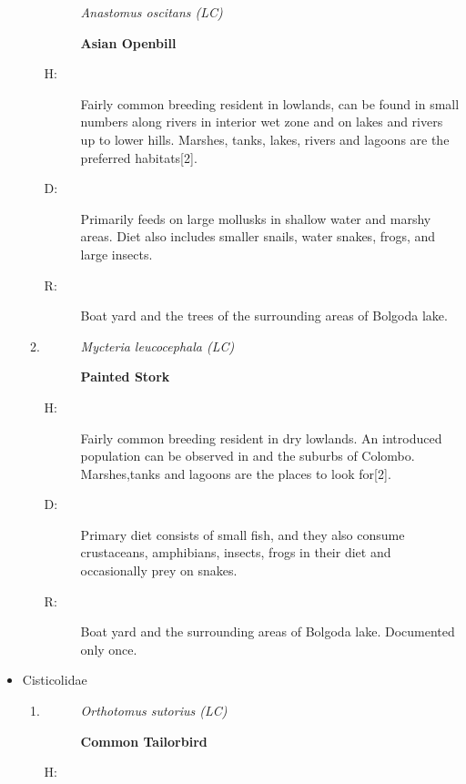\begin{itemize}
\begin{enumerate}
\begin{description}%
\item[]%
\textit{Anastomus oscitans (LC)}%
\item[]%
\textbf{Asian Openbill}%
\end{description}%
\begin{description}%
\item[H: ]%
Fairly common breeding resident in lowlands, can be found in small numbers along rivers in interior wet zone and on lakes and rivers up to lower hills. Marshes, tanks, lakes, rivers and lagoons are the preferred habitats{[}2{]}.%
\item[D: ]%
Primarily feeds on large mollusks in shallow water and marshy areas. Diet also includes smaller snails, water snakes, frogs, and large insects.%
\item[R: ]%
Boat yard and the trees of the surrounding areas of Bolgoda lake.%
\end{description}%
\item%
\begin{description}%
\item[]%
\textit{Mycteria leucocephala (LC)}%
\item[]%
\textbf{Painted Stork}%
\end{description}%
\begin{description}%
\item[H: ]%
Fairly common breeding resident in dry lowlands. An introduced population can be observed in and the suburbs of Colombo. Marshes,tanks and lagoons are the places to look for{[}2{]}.%
\item[D: ]%
Primary diet consists of small fish, and they also consume crustaceans, amphibians, insects, frogs in their diet and occasionally prey on snakes.%
\item[R: ]%
Boat yard and the surrounding areas of Bolgoda lake. Documented only once.%
\end{description}%
\end{enumerate}%
\item%
Cisticolidae%
\begin{enumerate}%
\item%
\begin{description}%
\item[]%
\textit{Orthotomus sutorius (LC)}%
\item[]%
\textbf{Common Tailorbird}%
\end{description}%
\begin{description}%
\item[H: ]%

\end{description}
\end{enumerate}
\end{itemize}
